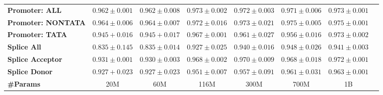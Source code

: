 \begin{table*}
{\begin{tabular}{@{}lccccccc@{}}
\textbf{Promoter: ALL}    &            $0.962 \pm  0.001$          &           $0.962\pm   0.008$            &       $0.973\pm 0.002$                 &       $0.972\pm 0.003$                &      $0.971\pm 0.006$                 &            $0.973 \pm 0.001$         \\
\textbf{Promoter: NONTATA}&            $0.964 \pm 0.006$          &           $0.964 \pm 0.007$          &           $0.972\pm 0.016$             &         $0.973\pm 0.021$              &     $0.975\pm 0.005$                  &           $ 0.975 \pm 0.001$          \\
\textbf{Promoter: TATA}   &           $0.945+0.016$           &            $0.945 +0.017$           &                $0.967\pm 0.001$        &             $0.961\pm 0.027$          &         $0.956\pm 0.016$              &           $0.973 \pm 0.002$           \\
\textbf{Splice All}       &           $0.835 \pm 0.145$           &          $0.835 \pm 0.014$             &         $0.927\pm 0.025$               &        $0.940\pm 0.016$               &      $0.948\pm 0.026$                 &         $0.941 \pm 0.003$             \\
\textbf{Splice Acceptor}  &             $0.931\pm 0.001$         &          $0.930 \pm 0.003$             &          $0.968\pm 0.002$              &         $0.970\pm 0.009$              &       $0.968\pm 0.018$                &         $  0.972 \pm 0.001 $           \\
\textbf{Splice Donor}     &            $0.927+0.023$          &           $0.927 \pm 0.023$            &            $0.951\pm 0.007$            &         $0.957 \pm 0.091$              &         $0.961\pm 0.031$              &           $ 0.963 \pm 0.001$          \\
\textbf{\#Params}         & 20M                  & 60M                   & 116M                   & 300M                  & 700M                  & 1B                  \\ 
\bottomrule
\end{tabular}
}
\end{table*}


